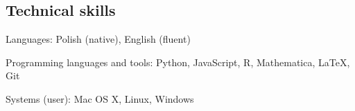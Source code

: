 \documentclass[margin,line]{resume}
\begin{document}
\begin{resume}
\vspace{3mm}

    \section{\mysidestyle Technical skills}
    \begin{list2}
        \item Languages: Polish (native), English (fluent)
        \item Programming languages and tools: Python, JavaScript, R, Mathematica, LaTeX, Git
        \item Systems (user): Mac OS X, Linux, Windows
    \end{list2}

\newpage


\end{resume}
\end{document}
